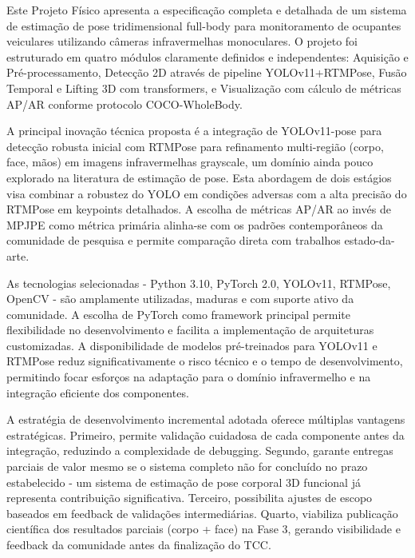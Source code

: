 \documentclass[12pt, a4paper]{article}
\begin{document}
Este Projeto Físico apresenta a especificação completa e detalhada de um sistema de estimação de pose tridimensional full-body para monitoramento de ocupantes veiculares utilizando câmeras infravermelhas monoculares. O projeto foi estruturado em quatro módulos claramente definidos e independentes: Aquisição e Pré-processamento, Detecção 2D através de pipeline YOLOv11+RTMPose, Fusão Temporal e Lifting 3D com transformers, e Visualização com cálculo de métricas AP/AR conforme protocolo COCO-WholeBody.

A principal inovação técnica proposta é a integração de YOLOv11-pose para detecção robusta inicial com RTMPose para refinamento multi-região (corpo, face, mãos) em imagens infravermelhas grayscale, um domínio ainda pouco explorado na literatura de estimação de pose. Esta abordagem de dois estágios visa combinar a robustez do YOLO em condições adversas com a alta precisão do RTMPose em keypoints detalhados. A escolha de métricas AP/AR ao invés de MPJPE como métrica primária alinha-se com os padrões contemporâneos da comunidade de pesquisa e permite comparação direta com trabalhos estado-da-arte.

As tecnologias selecionadas - Python 3.10, PyTorch 2.0, YOLOv11, RTMPose, OpenCV - são amplamente utilizadas, maduras e com suporte ativo da comunidade. A escolha de PyTorch como framework principal permite flexibilidade no desenvolvimento e facilita a implementação de arquiteturas customizadas. A disponibilidade de modelos pré-treinados para YOLOv11 e RTMPose reduz significativamente o risco técnico e o tempo de desenvolvimento, permitindo focar esforços na adaptação para o domínio infravermelho e na integração eficiente dos componentes.

A estratégia de desenvolvimento incremental adotada oferece múltiplas vantagens estratégicas. Primeiro, permite validação cuidadosa de cada componente antes da integração, reduzindo a complexidade de debugging. Segundo, garante entregas parciais de valor mesmo se o sistema completo não for concluído no prazo estabelecido - um sistema de estimação de pose corporal 3D funcional já representa contribuição significativa. Terceiro, possibilita ajustes de escopo baseados em feedback de validações intermediárias. Quarto, viabiliza publicação científica dos resultados parciais (corpo + face) na Fase 3, gerando visibilidade e feedback da comunidade antes da finalização do TCC.
\end{document}
